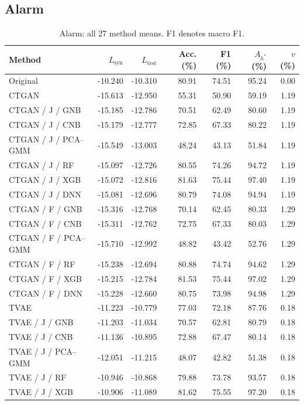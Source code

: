 \documentclass[11pt,letterpaper]{article}
\newcommand{\Lsyn}{L_{\mathrm{syn}}}
\newcommand{\Ltest}{L_{\mathrm{test}}}
\begin{document}
\subsection{Alarm}
\begin{table}[H]\centering
\caption{Alarm: all 27 method means. F1 denotes macro F1.}\label{tab:all-alarm}
\small
\begin{tabular}{lrrrrrr}\toprule
Method & $\Lsyn$ & $\Ltest$ & Acc. (\%) & F1 (\%) & $A_{h^*}$ (\%) & $v$ (\%)\\\midrule
Original & -10.240 & -10.310 & 80.91 & 74.51 & 95.24 & 0.00\\
CTGAN & -15.613 & -12.950 & 55.31 & 50.90 & 59.19 & 1.19\\
CTGAN / J / GNB & -15.185 & -12.786 & 70.51 & 62.49 & 80.60 & 1.19\\
CTGAN / J / CNB & -15.179 & -12.777 & 72.85 & 67.33 & 80.22 & 1.19\\
CTGAN / J / PCA--GMM & -15.549 & -13.003 & 48.24 & 43.13 & 51.84 & 1.19\\
CTGAN / J / RF & -15.097 & -12.726 & 80.55 & 74.26 & 94.72 & 1.19\\
CTGAN / J / XGB & -15.072 & -12.816 & 81.63 & 75.44 & 97.40 & 1.19\\
CTGAN / J / DNN & -15.081 & -12.696 & 80.79 & 74.08 & 94.94 & 1.19\\
CTGAN / F / GNB & -15.316 & -12.768 & 70.14 & 62.45 & 80.33 & 1.29\\
CTGAN / F / CNB & -15.311 & -12.762 & 72.75 & 67.33 & 80.03 & 1.29\\
CTGAN / F / PCA--GMM & -15.710 & -12.992 & 48.82 & 43.42 & 52.76 & 1.29\\
CTGAN / F / RF & -15.238 & -12.694 & 80.88 & 74.74 & 94.62 & 1.29\\
CTGAN / F / XGB & -15.215 & -12.784 & 81.53 & 75.44 & 97.02 & 1.29\\
CTGAN / F / DNN & -15.228 & -12.660 & 80.75 & 73.98 & 94.98 & 1.29\\
TVAE & -11.223 & -10.779 & 77.03 & 72.18 & 87.76 & 0.18\\
TVAE / J / GNB & -11.203 & -11.034 & 70.57 & 62.81 & 80.79 & 0.18\\
TVAE / J / CNB & -11.136 & -10.895 & 72.88 & 67.47 & 80.14 & 0.18\\
TVAE / J / PCA--GMM & -12.051 & -11.215 & 48.07 & 42.82 & 51.38 & 0.18\\
TVAE / J / RF & -10.946 & -10.868 & 79.88 & 73.78 & 93.57 & 0.18\\
TVAE / J / XGB & -10.906 & -11.089 & 81.62 & 75.55 & 97.20 & 0.18\\

\end{tabular}
\end{table}
\end{document}
